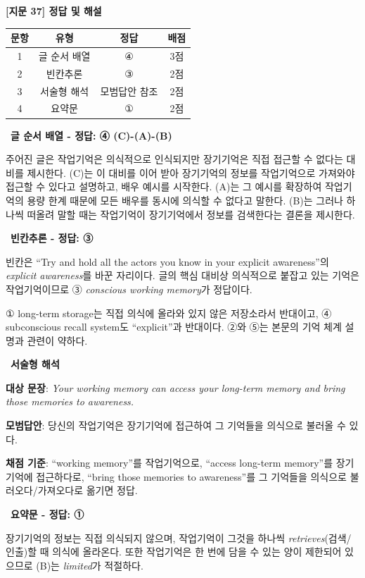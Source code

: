 \documentclass[11pt,a4paper]{article}
\newcommand{\qno}[1]{\par\vspace{10pt}{\sffamily\bfseries #1.}\ }
\begin{document}
\begin{center}
{\fontsize{15}{17}\selectfont\sffamily\bfseries [지문 37] 정답 및 해설}
\end{center}
\vspace{6pt}
\begin{center}
\renewcommand{\arraystretch}{1.35}
\begin{tabular}{cccc}
\toprule
문항 & 유형 & 정답 & 배점 \\
\midrule
1 & 글 순서 배열 & ④ & 3점 \\
2 & 빈칸추론 & ③ & 2점 \\
3 & 서술형 해석 & 모범답안 참조 & 2점 \\
4 & 요약문 & ① & 2점 \\
\bottomrule
\end{tabular}
\end{center}

\qno{1}\textbf{글 순서 배열 - 정답: ④ (C)-(A)-(B)}
\begin{pbox}
주어진 글은 작업기억은 의식적으로 인식되지만 장기기억은 직접 접근할 수 없다는 대비를 제시한다. (C)는 이 대비를 이어 받아 장기기억의 정보를 작업기억으로 가져와야 접근할 수 있다고 설명하고, 배우 예시를 시작한다. (A)는 그 예시를 확장하여 작업기억의 용량 한계 때문에 모든 배우를 동시에 의식할 수 없다고 말한다. (B)는 그러나 하나씩 떠올려 말할 때는 작업기억이 장기기억에서 정보를 검색한다는 결론을 제시한다.
\end{pbox}

\qno{2}\textbf{빈칸추론 - 정답: ③}
\begin{pbox}
빈칸은 ``Try and hold all the actors you know in your explicit awareness''의 \textit{explicit awareness}를 바꾼 자리이다. 글의 핵심 대비상 의식적으로 붙잡고 있는 기억은 작업기억이므로 ③ \textit{conscious working memory}가 정답이다.

\medskip
① long-term storage는 직접 의식에 올라와 있지 않은 저장소라서 반대이고, ④ subconscious recall system도 ``explicit''과 반대이다. ②와 ⑤는 본문의 기억 체계 설명과 관련이 약하다.
\end{pbox}

\qno{3}\textbf{서술형 해석}
\begin{pbox}
\textbf{대상 문장}: \textit{Your working memory can access your long-term memory and bring those memories to awareness.}

\medskip
\textbf{모범답안}: 당신의 작업기억은 장기기억에 접근하여 그 기억들을 의식으로 불러올 수 있다.

\medskip
\textbf{채점 기준}: ``working memory''를 작업기억으로, ``access long-term memory''를 장기기억에 접근하다로, ``bring those memories to awareness''를 그 기억들을 의식으로 불러오다/가져오다로 옮기면 정답.
\end{pbox}
\vspace{8pt}
\qno{4}\textbf{요약문 - 정답: ①}
\begin{pbox}
장기기억의 정보는 직접 의식되지 않으며, 작업기억이 그것을 하나씩 \textit{retrieves}(검색/인출)할 때 의식에 올라온다. 또한 작업기억은 한 번에 담을 수 있는 양이 제한되어 있으므로 (B)는 \textit{limited}가 적절하다.
\end{pbox}
\end{document}
